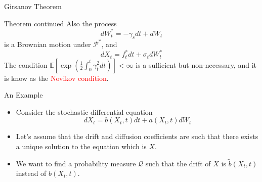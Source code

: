 \documentclass{beamer}
\begin{document}
\begin{frame}{Girsanov Theorem}
  \begin{block}{Theorem continued}
    Also the process
    \begin{equation}
      dW^*_t = -\gamma_s dt + dW_t
    \end{equation} 
    is a Brownian motion under $\mathcal{P}^*$, and 
    \begin{equation*}
      dX_t = f^*_t dt + \sigma_t dW^*_t
    \end{equation*}
    The condition $\mathbb{E}\left[\exp\left(\frac{1}{2}\int_0^t\gamma_t^2dt\right)\right]<\infty$ is a sufficient but non-necessary, and it is know as the \textcolor{red}{Novikov condition}.
  \end{block}
\end{frame}


\begin{frame}{An Example}
  \begin{itemize}
  \item Consider the stochastic differential equation
    \begin{equation*}
      dX_t = b(X_t, t) dt + a(X_t, t) dW_t
    \end{equation*}
  \item Let's assume that the drift and diffusion coefficients are such that there exists a unique solution to the equation which is $X$.
  \item We want to find a probability measure $\mathcal{Q}$ such that the drift of $X$ is $\tilde{b}(X_t,t)$ instead of $b(X_t,t)$.
  \end{itemize}
\end{frame}
\end{document}
